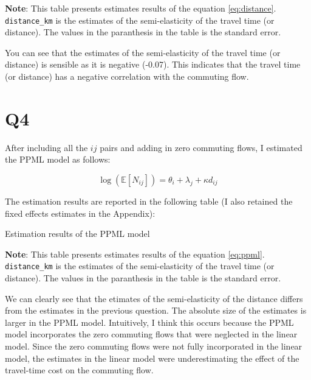 \documentclass[
  11pt]{article}
\begin{document}
\footnotesize \textbf{Note}: This table presents estimates results of
the equation \ref{eq:distance}. \texttt{distance\_km} is the estimates
of the semi-elasticity of the travel time (or distance). The values in
the paranthesis in the table is the standard error.\vspace{3em}

\normalsize

You can see that the estimates of the semi-elasticity of the travel time
(or distance) is sensible as it is negative (-0.07). This indicates that
the travel time (or distance) has a negative correlation with the
commuting flow.

\section*{Q4}\label{q4}

After including all the \(ij\) pairs and adding in zero commuting flows,
I estimated the PPML model as follows:

\[
\log(\mathbb{E}[N_{ij}])= \theta_{i} + \lambda_{j} + \kappa d_{ij}\label{eq:ppml}
\]

The estimation results are reported in the following table (I also
retained the fixed effects estimates in the Appendix):

\begin{table}[!ht]
\centering
\caption{Estimation results of the PPML model}
\label{tab:est_ppml}

\end{table}

\footnotesize \textbf{Note}: This table presents estimates results of
the equation \ref{eq:ppml}. \texttt{distance\_km} is the estimates of
the semi-elasticity of the travel time (or distance). The values in the
paranthesis in the table is the standard error.\vspace{3em}

\normalsize

We can clearly see that the etimates of the semi-elasticity of the
distance differs from the estimates in the previous question. The
absolute size of the estimates is larger in the PPML model. Intuitively,
I think this occurs because the PPML model incorporates the zero
commuting flows that were neglected in the linear model. Since the zero
commuting flows were not fully incorporated in the linear model, the
estimates in the linear model were underestimating the effect of the
travel-time cost on the commuting flow.
\end{document}
